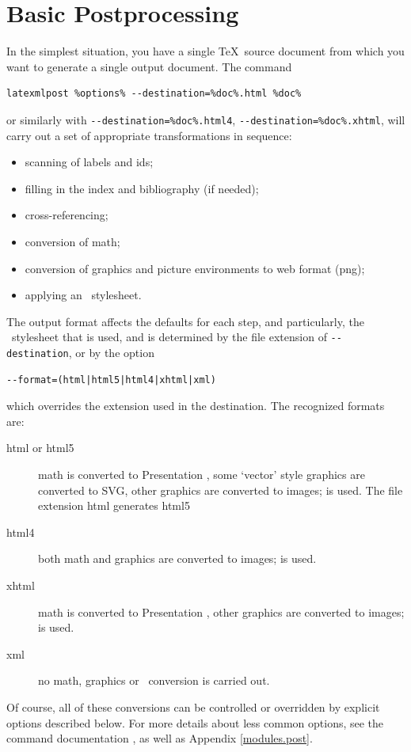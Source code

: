 \documentclass{book}
\newcommand{\shellcode}{\lstinline[style=shell]}
\begin{document}
\section[Postprocessing]{Basic Postprocessing}\label{usage.post}
In the simplest situation, you have a single \TeX\ source document
from which you want to generate a single output document.
The command
\begin{lstlisting}[style=shell]
latexmlpost %options% --destination=%doc%.html %doc%
\end{lstlisting}
or similarly with
\shellcode|--destination=%
\shellcode|--destination=%
will carry out a set of appropriate transformations in sequence:
\begin{itemize}
  \item scanning of labels and ids;
  \item filling in the index and bibliography (if needed);
  \item cross-referencing;
  \item conversion of math;
  \item conversion of graphics and picture environments to web format (png);
  \item applying an \XSLT\ stylesheet.
\end{itemize}
The output format affects the defaults for each step, and particularly,
the \XSLT\ stylesheet that is used, and is determined
by the file extension of \shellcode{--destination}, or by the option
\begin{lstlisting}[style=shell]
--format=(html|html5|html4|xhtml|xml)
\end{lstlisting}
which overrides the extension used in the destination. The recognized formats are:
\begin{description}
 \item[html or html5] math is converted to Presentation \MathML,
     some `vector' style graphics are converted to SVG,
     other graphics are converted to images;
      is used.
     The file extension html generates html5
 \item[html4] both math and graphics are converted to images;
     is used.
 \item[xhtml] math is converted to Presentation \MathML, other graphics are converted to images;
       is used.
 \item[xml] no math, graphics or \XSLT\ conversion is carried out.
\end{description}
Of course, all of these conversions can be controlled or overridden
by explicit options described below.
For more details about less common options, see the command
documentation , as well as Appendix \ref{modules.post}.
\end{document}
